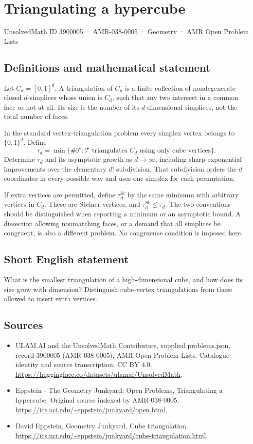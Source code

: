 \documentclass[11pt,a4paper]{article}
\begin{document}
\section*{Triangulating a hypercube}\label{3900005}
{\small UnsolvedMath ID 3900005 · AMR-038-0005 · Geometry · AMR Open Problem Lists}
\subsection{Definitions and mathematical statement}
Let $C_d=[0,1]^d$. A triangulation of $C_d$ is a finite collection of
nondegenerate closed $d$-simplices whose union is $C_d$, such that any two
intersect in a common face or not at all. Its size is the number of its
$d$-dimensional simplices, not the total number of faces.

In the standard vertex-triangulation problem every simplex vertex belongs
to $\{0,1\}^d$. Define
\[
 \tau_d=\min\{\#\mathcal T:\mathcal T\text{ triangulates }C_d
                 \text{ using only cube vertices}\}.
\]
Determine $\tau_d$ and its asymptotic growth as $d\to\infty$, including
sharp exponential improvements over the elementary $d!$ subdivision.
That subdivision orders the $d$ coordinates in every possible way and
uses one simplex for each permutation.

If extra vertices are permitted, define $\tau_d^{\mathrm{St}}$ by the same
minimum with arbitrary vertices in $C_d$. These are Steiner vertices, and
$\tau_d^{\mathrm{St}}\le\tau_d$. The two conventions should be distinguished
when reporting a minimum or an asymptotic bound. A dissection allowing
nonmatching faces, or a demand that all simplices be congruent, is also a
different problem. No congruence condition is imposed here.
\subsection{Short English statement}
What is the smallest triangulation of a high-dimensional cube, and how
does its size grow with dimension? Distinguish cube-vertex triangulations
from those allowed to insert extra vertices.
\subsection{Sources}
\begin{itemize}
\item[S1] ULAM.AI and the UnsolvedMath Contributors, supplied problems.json, record 3900005 (AMR-038-0005), AMR Open Problem Lists. Catalogue identity and source transcription; CC BY 4.0.
\url{https://huggingface.co/datasets/ulamai/UnsolvedMath}.
\item[S2] Eppstein - The Geometry Junkyard: Open Problems, Triangulating a hypercube. Original source indexed by AMR-038-0005.
\url{https://ics.uci.edu/~eppstein/junkyard/open.html}.
\item[S3] David Eppstein, Geometry Junkyard, Cube triangulation.
\url{https://ics.uci.edu/~eppstein/junkyard/cube-triangulation.html}.
\end{itemize}
\end{document}
